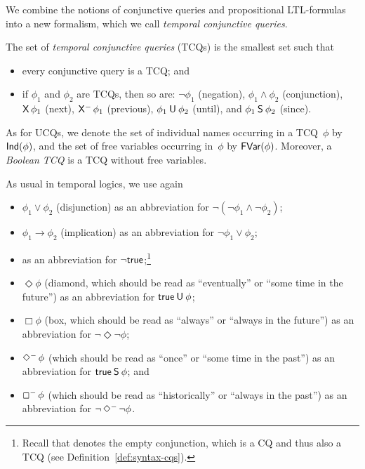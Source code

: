 We combine the notions of conjunctive queries and propositional LTL-formulas
into a new formalism, which we call \emph{temporal conjunctive queries}.

\begin{definition}
    The set of \emph{temporal conjunctive queries} (TCQs) is the smallest set
    such that
    \begin{itemize}
        \item every conjunctive query is a TCQ; and
        \item if $\phi_1$ and $\phi_2$ are TCQs, then so are: $\lnot\phi_1$
            (negation), $\phi_1\land\phi_2$ (conjunction), $\operatorname{\mathsf{X}}\phi_1$ (next),
            $\Previous\phi_1$ (previous), $\phi_1\mathbin{\mathsf{U}}\phi_2$ (until), and
            $\phi_1\mathbin{\mathsf{S}}\phi_2$ (since).
    \end{itemize}
\end{definition}

\noindent
As for UCQs, we denote the set of individual names occurring in a TCQ~$\phi$ by
$\mathsf{Ind}(\phi)$, and the set of free variables occurring in~$\phi$ by
$\operatorname{\mathsf{FVar}}(\phi)$.  Moreover, a \emph{Boolean TCQ} is a TCQ without free variables.

As usual in temporal logics, we use again
\begin{itemize}
    \item $\phi_1\lor\phi_2$ (disjunction) as an abbreviation for
        $\lnot(\lnot\phi_1\land\lnot\phi_2)$;
    \item $\phi_1\to\phi_2$ (implication) as an abbreviation for
        $\lnot\phi_1\lor\phi_2$;
    \item \false as an abbreviation for $\lnot\mathsf{true}$;\footnote{%
            Recall that \true denotes the empty conjunction, which is a CQ and
            thus also a TCQ (see Definition~\ref{def:syntax-cqs}).}
    \item $\Diamond\phi$ (diamond, which should be read as \enquote{eventually}
        or \enquote{some time in the future}) as an abbreviation for
        $\mathsf{true}\mathbin{\mathsf{U}}\phi$;
    \item $\Box\phi$ (box, which should be read as \enquote{always} or
        \enquote{always in the future}) as an abbreviation for
        $\lnot\Diamond\lnot\phi$;
    \item $\Diamondm\phi$ (which should be read as \enquote{once}
        or \enquote{some time in the past}) as an abbreviation for
        $\mathsf{true}\mathbin{\mathsf{S}}\phi$; and
    \item $\Boxm\phi$ (which should be read as \enquote{historically} or
        \enquote{always in the past}) as an abbreviation for
        $\lnot\Diamondm\lnot\phi$.
\end{itemize}

